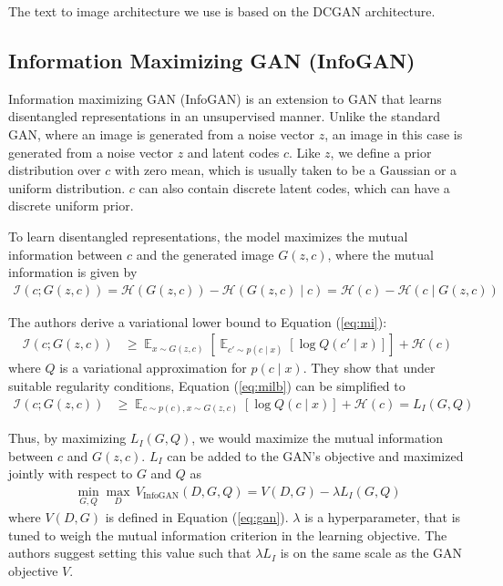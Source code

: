 \documentclass{article}
\DeclareMathOperator*{\E}{\mathbb{E}}
\begin{document}
The text to image architecture we use is based on the DCGAN architecture.



\subsection{Information Maximizing GAN (InfoGAN)}

Information maximizing GAN (InfoGAN)\cite{infogan} is an extension to GAN that learns disentangled representations in an unsupervised manner. Unlike the standard GAN, where an image is generated from a noise vector $z$, an image in this case is generated from a noise vector $z$ and latent codes $c$. Like $z$, we define a prior distribution over $c$ with zero mean, which is usually taken to be a Gaussian or a uniform distribution. $c$ can also contain discrete latent codes, which can have a discrete uniform prior.

To learn disentangled representations, the model maximizes the mutual information between $c$ and the generated image $G(z,c)$, where the mutual information is given by
\begin{align}
\mathcal{I}(c;G(z,c)) = \mathcal{H}(G(z,c)) - \mathcal{H}(G(z,c) \mid c) = \mathcal{H}(c) - \mathcal{H}(c\mid G(z,c)) \label{eq:mi}
\end{align}

The authors derive a variational lower bound to Equation (\ref{eq:mi}):
\begin{align}
\mathcal{I}(c;G(z,c)) &\geq \E_{x\sim G(z,c)}\left[\E_{c'\sim p(c\mid x)}\left[\log Q(c'\mid x)\right]\right] + \mathcal{H}(c) \label{eq:milb}
\end{align}
where $Q$ is a variational approximation for $p(c\mid x)$. They show that under suitable regularity conditions, Equation (\ref{eq:milb}) can be simplified to
\begin{align}
\mathcal{I}(c;G(z,c)) &\geq \E_{c\sim p(c), x\sim G(z,c)}\left[\log Q(c\mid x)\right] + \mathcal{H}(c) = L_I(G,Q) \label{eq:miloss}
\end{align}

Thus, by maximizing $L_I(G,Q)$, we would maximize the mutual information between $c$ and $G(z,c)$. $L_I$ can be added to the GAN's objective and maximized jointly with respect to $G$ and $Q$ as
\begin{align}
\min_{G,Q} \max_D\, V_{\text{InfoGAN}}(D,G,Q) = V(D,G) - \lambda L_I(G,Q)
\end{align}
where $V(D,G)$ is defined in Equation (\ref{eq:gan}). $\lambda$ is a hyperparameter, that is tuned to weigh the mutual information criterion in the learning objective. The authors suggest setting this value such that $\lambda L_I$ is on the same scale as the GAN objective $V$.
\end{document}
